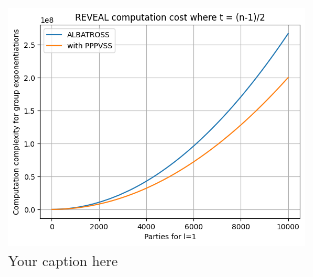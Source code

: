 \begin{figure}[htbp]
  \centering
  \includegraphics[width=0.7\textwidth]{figures/exponent.png}
  \caption{Your caption here}
  \label{fig:commit_exponent}
\end{figure}